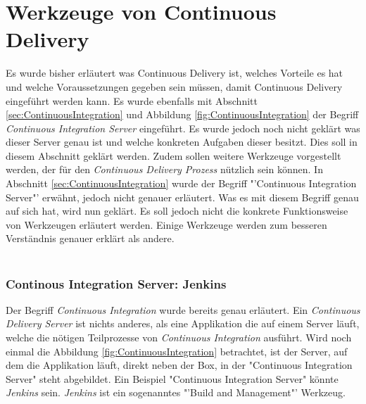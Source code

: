 \section{Werkzeuge von Continuous Delivery}
\label{sec:WerkzeugeCD}
Es wurde bisher erläutert was Continuous Delivery ist, welches Vorteile es hat und welche Voraussetzungen gegeben sein müssen, damit Continuous Delivery eingeführt werden kann. Es wurde ebenfalls mit Abschnitt \ref{sec:ContinuousIntegration}  und Abbildung \ref{fig:ContinuousIntegration}  der Begriff \textit{Continuous Integration Server} eingeführt. Es wurde jedoch noch nicht geklärt was dieser Server genau ist und welche konkreten Aufgaben dieser besitzt. Dies soll in diesem Abschnitt geklärt werden. Zudem sollen weitere Werkzeuge vorgestellt werden, der für den \textit{Continuous Delivery Prozess} nützlich sein können.
In Abschnitt \ref{sec:ContinuousIntegration}  wurde der Begriff "'Continuous Integration Server"' erwähnt, jedoch nicht genauer erläutert. Was es mit diesem Begriff genau auf sich hat, wird nun geklärt. Es soll jedoch nicht die konkrete Funktionsweise von Werkzeugen erläutert werden. Einige Werkzeuge werden zum besseren Verständnis genauer erklärt als andere.
\\\\
\subsubsection*{Continous Integration Server: Jenkins}
Der Begriff \textit{Continuous Integration} wurde bereits genau erläutert. Ein \textit{Continuous Delivery Server} ist nichts anderes, als eine Applikation die auf einem Server läuft, welche die nötigen Teilprozesse von \textit{Continuous Integration} ausführt. Wird noch einmal die Abbildung \ref{fig:ContinuousIntegration}  betrachtet, ist der Server, auf dem die Applikation läuft, direkt neben der Box, in der "Continuous Integration Server" steht abgebildet. Ein Beispiel "Continuous Integration Server" könnte \textit{Jenkins} sein. \textit{Jenkins} ist ein sogenanntes "'Build and Management"' Werkzeug.

